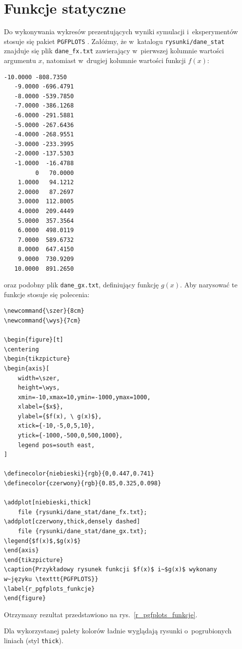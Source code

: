 \section{Funkcje statyczne}
Do wykonywania wykresów prezentujących wyniki symulacji i~eksperymentów stosuje się pakiet \verb+PGFPLOTS+ \cite{litFeuersanger2016}. Załóżmy, że w~katalogu \verb+rysunki/dane_stat+ znajduje się plik \verb+dane_fx.txt+ zawierający w~pierwszej kolumnie wartości argumentu $x$, natomiast w~drugiej kolumnie wartości funkcji $f(x)$:
\begin{lstlisting}[style=customlatex,frame=single]
  -10.0000 -808.7350
   -9.0000 -696.4791
   -8.0000 -539.7850
   -7.0000 -386.1268
   -6.0000 -291.5881
   -5.0000 -267.6436
   -4.0000 -268.9551
   -3.0000 -233.3995
   -2.0000 -137.5303
   -1.0000  -16.4788
         0   70.0000
    1.0000   94.1212
    2.0000   87.2697
    3.0000  112.8005
    4.0000  209.4449
    5.0000  357.3564
    6.0000  498.0119
    7.0000  589.6732
    8.0000  647.4150
    9.0000  730.9209
   10.0000  891.2650
\end{lstlisting}
oraz podobny plik \verb+dane_gx.txt+, definiujący funkcję $g(x)$. Aby narysować te funkcje stosuje się polecenia:
\begin{lstlisting}[style=customlatex,frame=single]
\newcommand{\szer}{8cm}
\newcommand{\wys}{7cm}

\begin{figure}[t]
\centering
\begin{tikzpicture}
\begin{axis}[
	width=\szer,
	height=\wys,
	xmin=-10,xmax=10,ymin=-1000,ymax=1000,
	xlabel={$x$},
	ylabel={$f(x), \ g(x)$},
	xtick={-10,-5,0,5,10},
	ytick={-1000,-500,0,500,1000},
	legend pos=south east,
]

\definecolor{niebieski}{rgb}{0,0.447,0.741}
\definecolor{czerwony}{rgb}{0.85,0.325,0.098}	

\addplot[niebieski,thick]
	file {rysunki/dane_stat/dane_fx.txt};
\addplot[czerwony,thick,densely dashed]
	file {rysunki/dane_stat/dane_gx.txt};
\legend{$f(x)$,$g(x)$}
\end{axis}
\end{tikzpicture}
\caption{Przykładowy rysunek funkcji $f(x)$ i~$g(x)$ wykonany 
w~języku \texttt{PGFPLOTS}}
\label{r_pgfplots_funkcje}
\end{figure}
\end{lstlisting}
Otrzymany rezultat przedstawiono na rys.~\ref{r_pgfplots_funkcje}.

Dla wykorzystanej palety kolorów ładnie wyglądają rysunki o~pogrubionych liniach (styl \verb+thick+).

